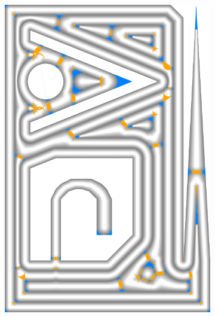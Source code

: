 \begin{figure}
\begin{subfigure}{\figwidth}
\includegraphics[height=\figheight]{sources-validation-gMAT-example-TEST-Center-accuracy.png}

\end{subfigure}
\end{figure}
